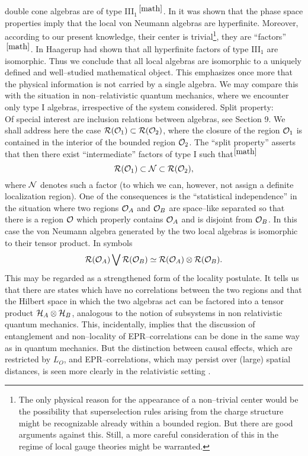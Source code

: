 double cone algebras are of type III$_1$$^{\, {\ref{math}}}$. 
In \cite{BuDaFr} it was shown that the phase space properties 
imply that the local von Neumann algebras are hyperfinite.
Moreover, according to our present 
knowledge, their center is trivial\footnote{The only 
physical reason for the appearance 
of a non--trivial center would be the possibility that superselection rules 
arising from the charge structure might be recognizable already
within a bounded region. But there are good arguments against 
this. Still, a more careful consideration of this in the regime of
local gauge theories might be warranted.}, 
they are ``factors''$^{\, {\ref{math}}}$. 
In \cite{Haa} Haagerup had shown that all hyperfinite factors
of type III$_1$ are isomorphic. Thus we conclude that all local 
algebras are isomorphic to a uniquely defined and well--studied
mathematical object. This emphasizes once more that the physical 
information is not carried by a single algebra. We may compare 
this with the situation in non--relativistic quantum mechanics, 
where we encounter only type I algebras, irrespective of the 
system considered. \newpage
{\noindent \subsect Split property:} \\[2mm] 
Of special interest are inclusion relations between algebras, see
Section 9. We shall address here the case ${\cal R} ({\cal
  O}_1) \subset {\cal R} ({\cal O}_2)$, where the closure of the
region ${\cal O}_1$ is contained in the interior of the  
bounded region ${\cal O}_2$. The  ``split property'' asserts
that then there exist ``intermediate'' factors of type I
such that$^{\ref{math}}$ 
\begin{equation} 
{\cal R} ({\cal O}_1) \subset {\cal N} \subset {\cal R} ({\cal
  O}_2),
\end{equation}
where ${\cal N}$ denotes such a factor (to which we can, however,
not assign a definite localization region). One of the consequences
is the ``statistical independence'' in the situation where 
two regions ${\cal O}_A$ and ${\cal O}_B$ are space--like separated
so that  there is a region ${\cal O}$ which properly contains 
${\cal O}_A$ and is disjoint from ${\cal O}_B$. In this case the 
von Neumann algebra generated by the two local algebras is 
isomorphic to their tensor product. In symbols
\begin{equation} 
{\cal R} ({\cal O}_A) \bigvee {\cal R} ({\cal O}_B)
\simeq {\cal R} ({\cal O}_A) \otimes {\cal R} ({\cal O}_B). 
\end{equation}
This may be regarded as a strengthened form of the locality 
postulate. It tells us that there are states which have no
correlations between the two regions and that the Hilbert space in which 
the two algebras act can be factored into a tensor product 
${\cal H}_A \otimes {\cal H}_B$, analogous to the notion of
subsystems in non relativistic quantum mechanics. This, incidentally,
implies that the discussion of entanglement and non--locality
of EPR--correlations can be done in the same way as in quantum 
mechanics. But the distinction between causal effects, which
are restricted by $L_O$, and EPR--correlations, which 
may persist over (large) spatial distances, is seen more 
clearly in the relativistic setting \cite{SuWe}.

